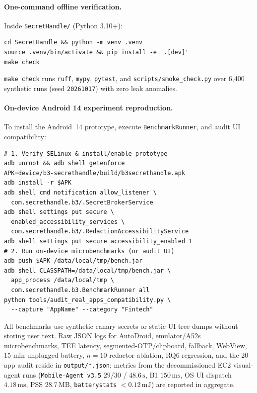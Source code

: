 \documentclass[sigconf,10pt]{acmart}
\theoremstyle{acmplain}%
\begin{document}
\paragraph{One-command offline verification.} Inside \texttt{SecretHandle/} (Python 3.10+):
\begin{small}
\begin{verbatim}
cd SecretHandle && python -m venv .venv
source .venv/bin/activate && pip install -e '.[dev]'
make check
\end{verbatim}
\end{small}
\texttt{make check} runs \texttt{ruff}, \texttt{mypy}, \texttt{pytest}, and \texttt{scripts/\allowbreak smoke\_\allowbreak check.py} over 6,400 synthetic runs (seed \texttt{20261017}) with zero leak anomalies.

\paragraph{On-device Android 14 experiment reproduction.} To install the Android~14 prototype, execute \texttt{BenchmarkRunner}, and audit UI compatibility:
\begin{small}
\begin{verbatim}
# 1. Verify SELinux & install/enable prototype
adb unroot && adb shell getenforce
APK=device/b3-secrethandle/build/b3secrethandle.apk
adb install -r $APK
adb shell cmd notification allow_listener \
  com.secrethandle.b3/.SecretBrokerService
adb shell settings put secure \
  enabled_accessibility_services \
  com.secrethandle.b3/.RedactionAccessibilityService
adb shell settings put secure accessibility_enabled 1
# 2. Run on-device microbenchmarks (or audit UI)
adb push $APK /data/local/tmp/bench.jar
adb shell CLASSPATH=/data/local/tmp/bench.jar \
  app_process /data/local/tmp \
  com.secrethandle.b3.BenchmarkRunner all
python tools/audit_real_apps_compatibility.py \
  --capture "AppName" --category "Fintech"
\end{verbatim}
\end{small}
All benchmarks use synthetic canary secrets or static UI tree dumps without storing user text. Raw JSON logs for AutoDroid, emulator/A52s microbenchmarks, TEE latency, segmented-OTP/clipboard, fallback, WebView, 15-min unplugged battery, $n=10$ redactor ablation, RQ6 regression, and the 20-app audit reside in \texttt{output/*.json}; metrics from the decommissioned EC2 visual-agent runs (\texttt{Mobile-Agent v3.5} $29/30$ / $48.6\,\text{s}$, B1 $150\,\text{ms}$, OS UI dispatch $4.18\,\text{ms}$, PSS $28.7\,\text{MB}$, \texttt{batterystats} $<0.12\,\text{mJ}$) are reported in aggregate.
\end{document}
